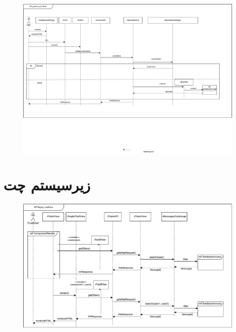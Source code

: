 \begin{figure}[ht!]
	\centering
	\includegraphics[scale=0.8]{figs/design-sequence/3-42.pdf}
\end{figure}

\FloatBarrier
\newpage

\eject \pdfpagewidth=10in \pdfpageheight=9in

\section{زیرسیستم چت}

\begin{figure}[ht!]
	\centering
	\includegraphics[scale=0.8]{figs/design-sequence/3-47.pdf}
\end{figure}
\FloatBarrier
\newpage

